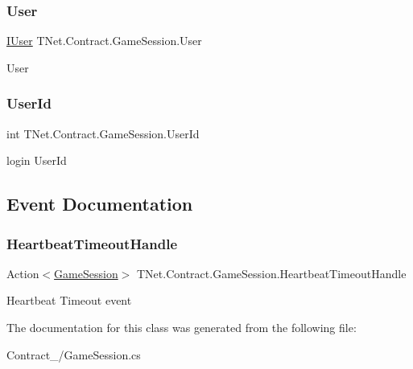\subsubsection{\texorpdfstring{User}{User}}
{\footnotesize\ttfamily \mbox{\hyperlink{interface_t_net_1_1_context___1_1_i_user}{I\+User}} T\+Net.\+Contract.\+Game\+Session.\+User\hspace{0.3cm}{\ttfamily [get]}}



User 

\mbox{\label{class_t_net_1_1_contract_1_1_game_session_a3acae323bf7aaf378c059b75f2c56145}} 
\subsubsection{\texorpdfstring{User\+Id}{UserId}}
{\footnotesize\ttfamily int T\+Net.\+Contract.\+Game\+Session.\+User\+Id\hspace{0.3cm}{\ttfamily [get]}}



login User\+Id 



\subsection{Event Documentation}
\mbox{\label{class_t_net_1_1_contract_1_1_game_session_a20dadeea8c09220c6f3938bfe62fe16b}} 
\subsubsection{\texorpdfstring{Heartbeat\+Timeout\+Handle}{HeartbeatTimeoutHandle}}
{\footnotesize\ttfamily Action$<$\mbox{\hyperlink{class_t_net_1_1_contract_1_1_game_session}{Game\+Session}}$>$ T\+Net.\+Contract.\+Game\+Session.\+Heartbeat\+Timeout\+Handle}



Heartbeat Timeout event 



The documentation for this class was generated from the following file\+:\begin{DoxyCompactItemize}
\item 
Contract\+\_\+/Game\+Session.\+cs\end{DoxyCompactItemize}
